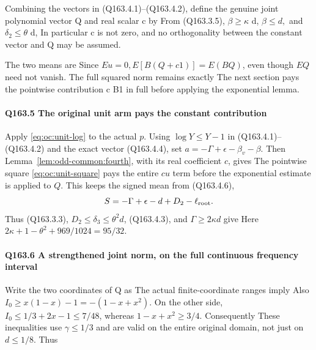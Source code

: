 Combining the vectors in (Q163.4.1)--(Q163.4.2), define the genuine joint polynomial
vector Q and real scalar c by
From (Q163.3.5), \(\beta\ge \kappa\) d, \(\beta\le d,\allowbreak \) and \(\delta_2\le \theta\) d,
In particular c is not zero, and no orthogonality between the constant
vector and Q may be assumed.

The two means are
Since \(Eu=0,\allowbreak  E[B(Q+c1)]=E(BQ)\), even though \(EQ\) need not vanish.
The full squared norm remains exactly
The next section pays the pointwise contribution c B1 in full before
applying the exponential lemma.

\paragraph{Q163.5 The original unit arm pays the constant contribution}

Apply \eqref{eq:oc:unit-log} to the actual \(p\).
Using \(\log Y\le Y-1\) in (Q163.4.1)--(Q163.4.2) and the exact
vector (Q163.4.4), set \(a=-\Gamma+\epsilon-\beta_v-\beta\). Then
Lemma~\ref{lem:odd-common:fourth}, with its real coefficient \(c\), gives
The pointwise square \eqref{eq:oc:unit-square} pays the entire
\(cu\) term before the exponential estimate is applied to \(Q\).
This keeps the signed mean from (Q163.4.6),
\[
 S=-\Gamma+\epsilon-d+D_2-\ell_{\rm root}.
\]
Thus (Q163.3.3), \(D_2\le\delta_3\le\theta^2d\),
(Q163.4.3), and \(\Gamma\ge2\kappa d\) give
Here \(2\kappa+1-\theta^2+969/1024=95/32\).

\paragraph{Q163.6 A strengthened joint norm, on the full continuous frequency interval}

Write the two coordinates of Q as
The actual finite-coordinate ranges imply
Also \(I_0\ge x(1-x)-1=-(1-x+x^2)\). On the other side,
\(I_0\le1/3+2x-1\le7/48\), whereas \(1-x+x^2\ge3/4\).
Consequently
These inequalities use \(\gamma\le 1/3\) and are valid on the entire original
domain, not just on \(d\le 1/8.\) Thus

